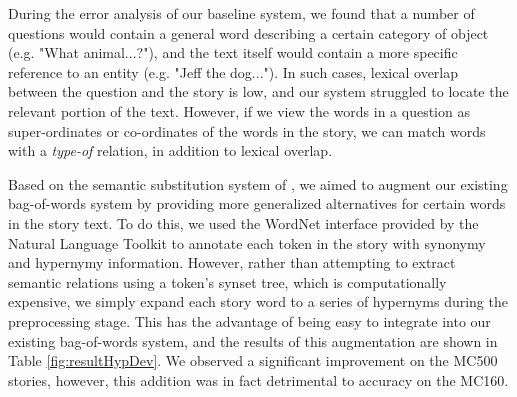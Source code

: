 


During the error analysis of our baseline system, we found that a number of questions would contain a general word describing a certain category of object (e.g. "What animal...?"), and the text itself would contain a more specific reference to an entity (e.g. "Jeff the dog..."). In such cases, lexical overlap between the question and the story is low, and our system struggled to locate the relevant portion of the text. However, if we view the words in a question as super-ordinates or co-ordinates of the words in the story, we can match words with a \textit{type-of} relation, in addition to lexical overlap.

Based on the semantic substitution system of , we aimed to augment our existing bag-of-words system by providing more generalized alternatives for certain words in the story text. To do this, we used the WordNet \cite{miller1995wordnet} interface provided by the Natural Language Toolkit \cite{bird2006nltk} to annotate each token in the story with synonymy and hypernymy information. However, rather than attempting to extract semantic relations using a token's synset tree, which is computationally expensive, we simply expand each story word to a series of hypernyms during the preprocessing stage. This has the advantage of being easy to integrate into our existing bag-of-words system, and the results of this augmentation are shown in Table \ref{fig:resultHypDev}. We observed a significant improvement on the MC500 stories, however, this addition was in fact detrimental to accuracy on the MC160.

